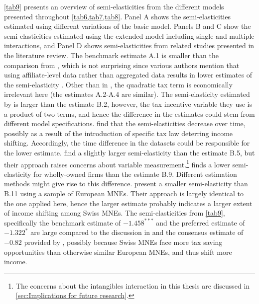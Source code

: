 \documentclass[10pt,twocolumn,oneside,cmyk]{article}
\begin{document}
\cref{tab9} presents an overview of semi-elasticities from the different models presented throughout \cref{tab6,tab7,tab8}. Panel A shows the semi-elasticities estimated using different variations of the basic model. Panels B and C show the semi-elasticities estimated using the extended model including single and multiple interactions, and Panel D shows semi-elasticities from related studies presented in the literature review. The benchmark estimate A.1 is smaller than the comparison from \textcite{hines_fiscal_1994}, which is not surprising since various authors mention that using affiliate-level data rather than aggregated data results in lower estimates of the semi-elasticity \parencites[15, 18]{heckemeyer_multinationals_2013}[431]{dharmapala_what_2014}. Other than in \textcite[163]{hines_fiscal_1994}, the quadratic tax term is economically irrelevant here (the estimates A.2-A.4 are similar). The semi-elasticity estimated by \textcite{huizinga_international_2008} is larger than the estimate B.2, however, the tax incentive variable they use is a product of two terms, and hence the difference in the estimates could stem from different model specifications. \textcite[18]{heckemeyer_multinationals_2013} find that the semi-elasticities decrease over time, possibly as a result of the introduction of specific tax law deterring income shifting. Accordingly, the time difference in the datasets could be responsible for the lower estimate. \textcite{beer_profit_2015} find a slightly larger semi-elasticity than the estimate B.5, but their approach raises concerns about variable measurement.\footnote{The concerns about the intangibles interaction in this thesis are discussed in \cref{sec:Implications for future research}.} \textcite{dischinger_profit_2008}finds a lower semi-elasticity for wholly-owned firms than the estimate B.9. Different estimation methods might give rise to this difference. \textcite{dischinger_role_2014} present a smaller semi-elasticity than B.11 using a sample of European MNEs. Their approach is largely identical to the one applied here, hence the larger estimate probably indicates a larger extent of income shifting among Swiss MNEs. The semi-elasticities from \cref{tab9}, specifically the benchmark estimate of $-1.458^{***}$ and the preferred estimate of $-1.322^*$ are large compared to the discussion in \textcite[431-432]{dharmapala_what_2014} and the consensus estimate of $-0.82$ provided by \textcite[22-23]{heckemeyer_multinationals_2013}, possibly because Swiss MNEs face more tax saving opportunities than otherwise similar European MNEs, and thus shift more income.
\end{document}
